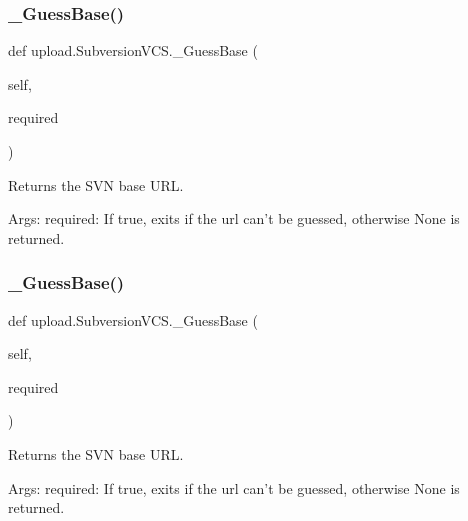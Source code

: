 \subsubsection{\texorpdfstring{\_GuessBase()}{\_GuessBase()}\hspace{0.1cm}{\footnotesize\ttfamily [1/2]}}
{\footnotesize\ttfamily def upload.\+Subversion\+V\+C\+S.\+\_\+\+Guess\+Base (\begin{DoxyParamCaption}\item[{}]{self,  }\item[{}]{required }\end{DoxyParamCaption})\hspace{0.3cm}{\ttfamily [private]}}

\begin{DoxyVerb}Returns the SVN base URL.

Args:
  required: If true, exits if the url can't be guessed, otherwise None is
returned.
\end{DoxyVerb}
 \mbox{\label{classupload_1_1_subversion_v_c_s_ad257205675d7d9d291145f4aa405964b}} 
\subsubsection{\texorpdfstring{\_GuessBase()}{\_GuessBase()}\hspace{0.1cm}{\footnotesize\ttfamily [2/2]}}
{\footnotesize\ttfamily def upload.\+Subversion\+V\+C\+S.\+\_\+\+Guess\+Base (\begin{DoxyParamCaption}\item[{}]{self,  }\item[{}]{required }\end{DoxyParamCaption})\hspace{0.3cm}{\ttfamily [private]}}

\begin{DoxyVerb}Returns the SVN base URL.

Args:
  required: If true, exits if the url can't be guessed, otherwise None is
returned.
\end{DoxyVerb}
 \mbox{\label{classupload_1_1_subversion_v_c_s_a07c2d341f2c7df2772dd7f85e89b0212}} 
